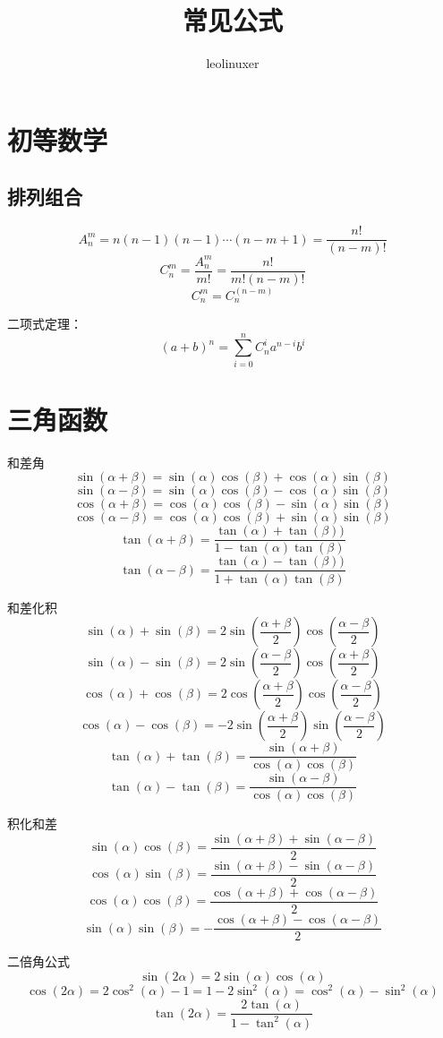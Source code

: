 \documentclass[12pt]{article}
\title{常见公式}
\author{leolinuxer}
\begin{document}
\maketitle

\section{初等数学}
\subsection{排列组合}
$$
A_n^m = n(n-1)(n-1) \cdots (n-m+1) = \frac{n!}{(n-m)!}
$$
$$
C_n^m = \frac{A_n^m}{m!} = \frac{n!}{m!(n-m)!}
$$
$$
C_n^m = C_n^{(n-m)}
$$

二项式定理：
$$
(a+b)^n = \sum_{i=0}^n{C_n^ia^{n-i}b^i}
$$

\section{三角函数}
和差角
$$
\sin(\alpha + \beta) = \sin(\alpha)\cos(\beta) + \cos(\alpha)\sin(\beta)
$$
$$
\sin(\alpha - \beta) = \sin(\alpha)\cos(\beta) - \cos(\alpha)\sin(\beta)
$$
$$
\cos(\alpha + \beta) = \cos(\alpha)\cos(\beta) - \sin(\alpha)\sin(\beta)
$$
$$
\cos(\alpha - \beta) = \cos(\alpha)\cos(\beta) + \sin(\alpha)\sin(\beta)
$$
$$
\tan(\alpha + \beta) = \frac{\tan(\alpha) + \tan(\beta))}{1 - \tan(\alpha)\tan(\beta)}
$$
$$
\tan(\alpha - \beta) = \frac{\tan(\alpha) - \tan(\beta))}{1 + \tan(\alpha)\tan(\beta)}
$$

和差化积
$$
\sin(\alpha) + \sin(\beta) = 2\sin(\frac{\alpha + \beta}{2})\cos(\frac{\alpha - \beta}{2})
$$
$$
\sin(\alpha) - \sin(\beta) = 2\sin(\frac{\alpha - \beta}{2})\cos(\frac{\alpha + \beta}{2})
$$
$$
\cos(\alpha) + \cos(\beta) = 2\cos(\frac{\alpha + \beta}{2})\cos(\frac{\alpha - \beta}{2})
$$
$$
\cos(\alpha) - \cos(\beta) = -2\sin(\frac{\alpha + \beta}{2})\sin(\frac{\alpha - \beta}{2})
$$
$$
\tan(\alpha) + \tan(\beta) = \frac{\sin(\alpha + \beta)}{\cos(\alpha)\cos(\beta)}
$$
$$
\tan(\alpha) - \tan(\beta) = \frac{\sin(\alpha - \beta)}{\cos(\alpha)\cos(\beta)}
$$

积化和差
$$
\sin(\alpha)\cos(\beta) = \frac{\sin(\alpha + \beta) + \sin(\alpha - \beta)}{2} 
$$
$$
\cos(\alpha)\sin(\beta) = \frac{\sin(\alpha + \beta) - \sin(\alpha - \beta)}{2} 
$$
$$
\cos(\alpha)\cos(\beta) = \frac{\cos(\alpha + \beta) + \cos(\alpha - \beta)}{2} 
$$
$$
\sin(\alpha)\sin(\beta) = -\frac{\cos(\alpha + \beta) - \cos(\alpha - \beta)}{2} 
$$

二倍角公式
$$
\sin(2\alpha) = 2\sin(\alpha)\cos(\alpha)
$$
$$
\cos(2\alpha) = 2\cos^2(\alpha) - 1 = 1 - 2\sin^2(\alpha) = \cos^2(\alpha) - \sin^2(\alpha)
$$
$$
\tan(2\alpha) = \frac{2\tan(\alpha)}{1 - \tan^2(\alpha)}
$$
\end{document}
